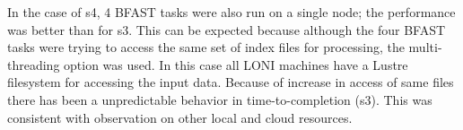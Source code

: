 \documentclass{cpeauth}
\begin{document}





In the case of s4, 4 BFAST tasks were also run on a single node; the
performance was better than for s3. This can be expected because
although the four BFAST tasks were trying to access the same set of
index files for processing, the multi-threading option was used.  In
this case all LONI machines have a Lustre filesystem for accessing the
input data.  Because of increase in access of same files there has
been a unpredictable behavior in time-to-completion (s3). This was
consistent with observation on other local and cloud resources.
\end{document}
